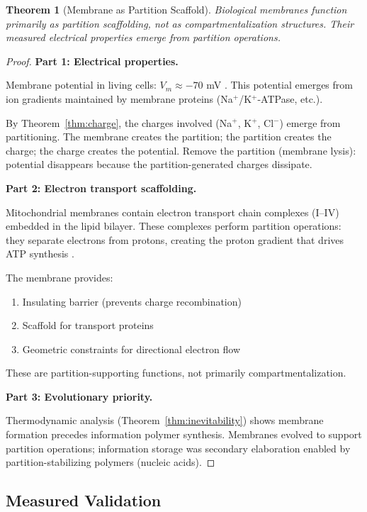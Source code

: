 \documentclass[twocolumn,10pt,a4paper]{article}
\newtheorem{theorem}{Theorem}[section]
\theoremstyle{definition}
\theoremstyle{remark}
\begin{document}
\begin{theorem}[Membrane as Partition Scaffold]
\label{thm:membrane}
Biological membranes function primarily as partition scaffolding, not as compartmentalization structures. Their measured electrical properties emerge from partition operations.
\end{theorem}

\begin{proof}
\textbf{Part 1: Electrical properties.}

Membrane potential in living cells: $V_m \approx -70$ mV \cite{hodgkin1952}. This potential emerges from ion gradients maintained by membrane proteins (Na$^+$/K$^+$-ATPase, etc.).

By Theorem~\ref{thm:charge}, the charges involved (Na$^+$, K$^+$, Cl$^-$) emerge from partitioning. The membrane creates the partition; the partition creates the charge; the charge creates the potential. Remove the partition (membrane lysis): potential disappears because the partition-generated charges dissipate.

\textbf{Part 2: Electron transport scaffolding.}

Mitochondrial membranes contain electron transport chain complexes (I--IV) embedded in the lipid bilayer. These complexes perform partition operations: they separate electrons from protons, creating the proton gradient that drives ATP synthesis \cite{mitchell1961}.

The membrane provides:
\begin{enumerate}
    \item Insulating barrier (prevents charge recombination)
    \item Scaffold for transport proteins
    \item Geometric constraints for directional electron flow
\end{enumerate}

These are partition-supporting functions, not primarily compartmentalization.

\textbf{Part 3: Evolutionary priority.}

Thermodynamic analysis (Theorem~\ref{thm:inevitability}) shows membrane formation precedes information polymer synthesis. Membranes evolved to support partition operations; information storage was secondary elaboration enabled by partition-stabilizing polymers (nucleic acids).
\end{proof}

\subsection{Measured Validation}
\end{document}
